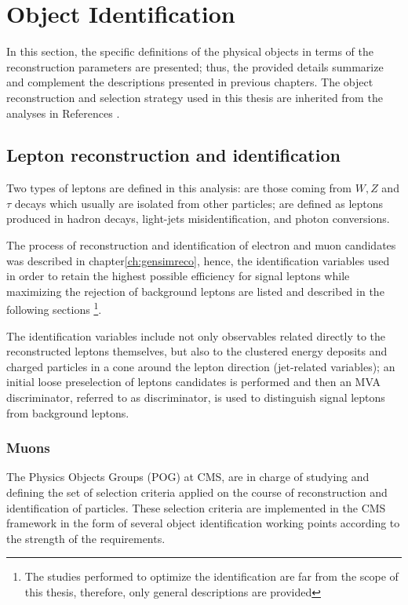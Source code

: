 \section{Object Identification}\label{sec:ob_id}


In this section, the specific definitions of the physical objects in terms of the reconstruction parameters are presented; thus, the provided details summarize and complement the descriptions presented in previous chapters. The object reconstruction and selection strategy used in this thesis are inherited from the analyses in References \cite{CMS_AN_2016-211,CMS_AN_2017-029}.

\subsection{Lepton reconstruction and identification}

Two types of leptons are defined in this analysis:  are those coming from $W, Z$ and $\tau$ decays which usually are isolated from other particles;  are defined as leptons produced in \bjet hadron decays, light-jets misidentification, and photon conversions. 

The process of reconstruction and identification of electron and muon candidates was described in chapter\ref{ch:gensimreco}, hence, the identification variables used in order to retain the highest possible efficiency for signal leptons while maximizing the rejection of background leptons are listed and described in the following sections \footnote{The studies performed to optimize the identification are far from the scope of this thesis, therefore, only general descriptions are provided}.

The identification variables include not only observables related directly to the reconstructed leptons themselves, but also to the clustered energy deposits and charged particles in a cone around the lepton direction (jet-related variables); an initial loose preselection of leptons candidates is performed and then an MVA discriminator, referred to as  discriminator, is used to distinguish signal leptons from background leptons.

\subsubsection*{Muons}

The Physics Objects Groups (POG) at CMS, are in charge of studying and defining the set of selection criteria applied on the course of reconstruction and identification of particles. These selection criteria are implemented in the CMS framework in the form of several object identification working points according to the strength of the requirements.

